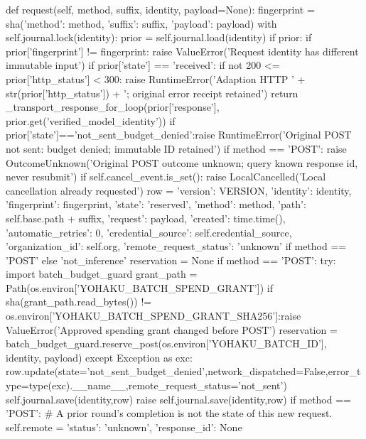 {    def request(self, method, suffix, identity, payload=None):
        fingerprint = sha({'method': method, 'suffix': suffix, 'payload': payload})
        with self.journal.lock(identity):
            prior = self.journal.load(identity)
            if prior:
                if prior['fingerprint'] != fingerprint:
                    raise ValueError('Request identity has different immutable input')
                if prior['state'] == 'received':
                    if not 200 <= prior['http_status'] < 300:
                        raise RuntimeError('Adaption HTTP ' + str(prior['http_status']) + '; original error receipt retained')
                    return _transport_response_for_loop(prior['response'], prior.get('verified_model_identity'))
                if prior['state']=='not_sent_budget_denied':raise RuntimeError('Original POST not sent: budget denied; immutable ID retained')
                if method == 'POST':
                    raise OutcomeUnknown('Original POST outcome unknown; query known response id, never resubmit')
            if self.cancel_event.is_set():
                raise LocalCancelled('Local cancellation already requested')
            row = {'version': VERSION, 'identity': identity, 'fingerprint': fingerprint,
                   'state': 'reserved', 'method': method, 'path': self.base.path + suffix,
                   'request': payload, 'created': time.time(), 'automatic_retries': 0,
                   'credential_source': self.credential_source, 'organization_id': self.org,
                   'remote_request_status': 'unknown' if method == 'POST' else 'not_inference'}
            reservation = None
            if method == 'POST':
                try:
                    import batch_budget_guard
                    grant_path = Path(os.environ['YOHAKU_BATCH_SPEND_GRANT'])
                    if sha(grant_path.read_bytes()) != os.environ['YOHAKU_BATCH_SPEND_GRANT_SHA256']:raise ValueError('Approved spending grant changed before POST')
                    reservation = batch_budget_guard.reserve_post(os.environ['YOHAKU_BATCH_ID'], identity, payload)
                except Exception as exc:
                    row.update(state='not_sent_budget_denied',network_dispatched=False,error_type=type(exc).__name__,remote_request_status='not_sent')
                    self.journal.save(identity,row)
                    raise
            self.journal.save(identity,row)
            if method == 'POST':
                # A prior round's completion is not the state of this new request.
                self.remote = {'status': 'unknown', 'response_id': None}
}
